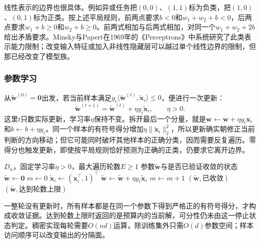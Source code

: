 线性表示的边界也很具体。例如异或任务把$(0,0)$、$(1,1)$标为负类，把$(1,0)$、$(0,1)$标为正类。按上述平局规则，前两点要求$b<0$和$w_1+w_2+b<0$，后两点要求$w_1+b\geq0$和$w_2+b\geq0$。前两式相加与后两式相加，对同一个$w_1+w_2+2b$给出矛盾要求。Minsky与Papert在1969年的《Perceptrons》中系统研究了此类表示能力限制；改变输入特征或加入非线性隐藏层可以越过单个线性边界的限制，但那已经改变了模型族。

\subsubsection{参数学习}
\label{sec:classification-perceptron-learning}

从$\tilde{\bm{w}}^{(0)}=\bm{0}$出发，若当前样本满足$y_i\langle\tilde{\bm{w}}^{(t)},\tilde{\bm{x}}_i\rangle\leq0$，便进行一次更新：
\begin{equation}
  \label{eq:classification-perceptron-update}
  \tilde{\bm{w}}^{(t+1)}
    =\tilde{\bm{w}}^{(t)}+\eta y_i\tilde{\bm{x}}_i,
    \qquad \eta>0 .
\end{equation}
这里$t$只数实际更新，学习率$\eta$保持不变。拆开最后一个分量，就是$\bm{w}\leftarrow\bm{w}+\eta y_i\bm{x}_i$和$b\leftarrow b+\eta y_i$。同一个样本的有符号得分增加$\eta\|\tilde{\bm{x}}_i\|_2^2$，所以更新确实朝修正当前判断的方向移动；但它可能同时破坏其他样本的正确分类，因而需要反复遍历。零得分也触发更新，即使按平局规则恰好预测为正确的正类，仍要求它离开边界。

\begin{algorithm}[带遍历上限的感知机训练]
  \label{alg:classification-perceptron}
  \begin{algorithmic}[1]
    \Require $D_n$，固定学习率$\eta>0$，最大遍历轮数$E\geq1$
    \Ensure 参数$\tilde{\bm{w}}$与是否已验证收敛的状态
    \State $\tilde{\bm{w}}\gets\bm{0}$
      \State $m\gets0$
        \State $\tilde{\bm{x}}_i\gets(\bm{x}_i^{\top},1)^{\top}$
          \State $\tilde{\bm{w}}\gets\tilde{\bm{w}}+\eta y_i\tilde{\bm{x}}_i$
          \State $m\gets m+1$
        \EndIf
      \EndFor
        \State \Return $(\tilde{\bm{w}},\text{已收敛})$
      \EndIf
    \EndFor
    \State \Return $(\tilde{\bm{w}},\text{达到轮数上限})$
  \end{algorithmic}
\end{algorithm}

一整轮没有更新时，所有样本都是在同一个参数下得到严格正的有符号得分，才构成收敛证据。达到轮数上限时返回的是预算内的当前解，可分性仍未由这一停止状态判定。稠密实现每轮需要$O(nd)$运算，除训练集外只需$O(d)$参数空间；样本访问顺序可以改变输出的分隔面。

